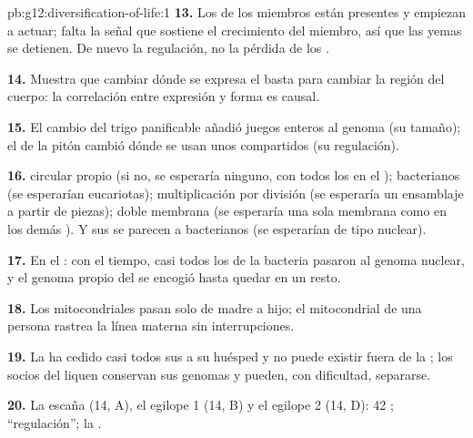 \begin{solution}{pb:g12:diversification-of-life:1}
\textbf{13.} Los  de los miembros están presentes y empiezan a
actuar; falta la señal que sostiene el crecimiento del miembro, así que
las yemas se detienen. De nuevo la regulación, no la pérdida de los
.

\textbf{14.} Muestra que cambiar dónde se expresa el  basta para
cambiar la región del cuerpo: la correlación entre expresión y forma es
causal.

\textbf{15.} El cambio del trigo panificable añadió juegos enteros al
genoma (su tamaño); el de la pitón cambió dónde se usan unos 
compartidos (su regulación).

\textbf{16.}  circular propio (si no, se esperaría ninguno, con
todos los  en el );  bacterianos (se esperarían
 eucariotas); multiplicación por división (se esperaría un
ensamblaje a partir de piezas); doble membrana (se esperaría una sola
membrana como en los demás ). Y sus  se parecen a 
bacterianos (se esperarían  de tipo nuclear).

\textbf{17.} En el : con el tiempo, casi todos los  de la
bacteria pasaron al genoma nuclear, y el genoma propio del  se
encogió hasta quedar en un resto.

\textbf{18.} Los  mitocondriales pasan solo de madre a hijo; el
 mitocondrial de una persona rastrea la línea materna sin
interrupciones.

\textbf{19.} La  ha cedido casi todos sus  a su
huésped y no puede existir fuera de la ; los socios del liquen
conservan sus genomas y pueden, con dificultad, separarse.

\textbf{20.} La escaña (14, A), el egilope 1 (14, B) y el egilope 2
(14, D): 42 ; ``regulación''; la .
\end{solution}
